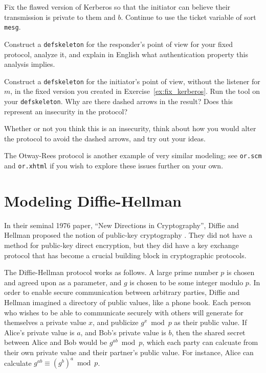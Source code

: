 \begin{exercise}
\label{ex:fix_kerberos}
Fix the flawed version of Kerberos so that the initiator can believe
their transmission is private to them and $b$.  Continue to use the
ticket variable of sort \texttt{mesg}.

Construct a \texttt{defskeleton} for the responder's point of view
for your fixed protocol, analyze it, and explain in English what
authentication property this analysis implies.
\end{exercise}

\begin{exercise}
  Construct a \texttt{defskeleton} for the initiator's point of view,
  without the listener for $m$, in the fixed version you created in
  Exercise~\ref{ex:fix_kerberos}.  Run the tool on your
  \texttt{defskeleton}.  Why are there dashed arrows in the result?
  Does this represent an insecurity in the protocol?

Whether or not you think this is an insecurity, think about how you
would alter the protocol to avoid the dashed arrows, and try out your
ideas.
\end{exercise}

  The Otway-Rees
protocol is another example of very similar modeling; see
\texttt{or.scm} and \texttt{or.xhtml} if you wish to explore these
issues further on your own.

\section{Modeling Diffie-Hellman}
\label{sec:dh}

In their seminal 1976 paper, ``New Directions in Cryptography'',
Diffie and Hellman proposed the notion of public-key cryptography
\cite{DiffieHellman76}.  They did not have a method for public-key direct
encryption, but they did have a key exchange protocol that has become
a crucial building block in cryptographic protocols.

The Diffie-Hellman protocol works as follows.  A large prime number
$p$ is chosen and agreed upon as a parameter, and $g$ is chosen to be
some integer modulo $p$.  In order to enable secure communication
between arbitrary parties, Diffie and Hellman imagined a directory of
public values, like a phone book.  Each person who wishes to be able
to communicate securely with others will generate for themselves a
private value $x$, and publicize $g^x \bmod p$ as their public value.
If Alice's private value is $a$, and Bob's private value is $b$, then
the shared secret between Alice and Bob would be $g^{ab} \bmod p$,
which each party can calcuate from their own private value and their
partner's public value.  For instance, Alice can calculate $g^{ab}
\equiv (g^b)^a \bmod p$.

